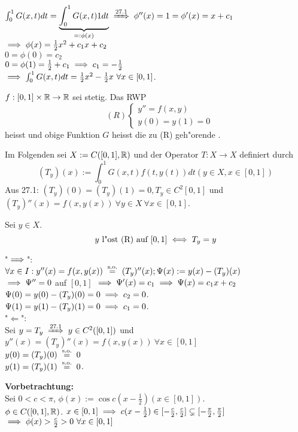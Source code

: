 \documentclass{article}
\begin{document}
\begin{beispiel}
$\int_0^1G(x,t)dt=\underbrace{\int_0^1G(x,t)1dt}_{=:\phi(x)}\folgtnach{27.1} \phi''(x)=1=\phi'(x)=x+c_1$\\
$\implies \phi(x)=\frac{1}{2}x^2+c_1x+c_2$\\
$0=\phi(0)=c_2$\\
$0=\phi(1)=\frac{1}{2}+c_1\implies c_1=-\frac{1}{2}$\\
$\implies \int_0^1G(x,t)dt=\frac{1}{2}x^2-\frac{1}{2}x\ \forall x\in[0,1]$.\\
\end{beispiel}
\begin{definition}
$f:[0,1]\times\mathbb{R}\to\mathbb{R}$ sei stetig. Das RWP
\[ \quad
(R)
\begin{cases}
y''=f(x,y)\\
y(0)=y(1)=0
\end{cases}
\]
heisst  und obige Funktion $G$ heisst die zu (R) geh"orende .
\end{definition}
Im Folgenden sei $X:=C([0,1],\mathbb{R})$ und der Operator $T:X\to X$ definiert durch\\
$$(T_y)(x):=\int_0^1G(x,t)f(t,y(t))dt (y\in X, x\in[0,1])$$
Aus 27.1: $(T_y)(0)=(T_y)(1)=0, T_y \in C^2[0,1]$ und $(T_y)''(x)=f(x,y(x))\ \forall y\in X\ \forall x\in[0,1]$.
\begin{satz}
Sei $y\in X$.
$$y \text{ l"ost (R) auf } [0,1] \iff T_y=y$$
\end{satz}
\begin{beweis}
"$\implies$":\\
$\forall x\in I: y''(x) = f(x,y(x)) \gleichnach{s.o.} (T_y)''(x);\Psi(x):=y(x)-(T_y)(x)$\\
$\implies \Psi'' = 0$ auf $[0,1]$ $\implies \Psi'(x) = c_1 \implies \Psi(x) = c_1x+c_2$\\
$\Psi(0)=y(0)-(T_y)(0)=0 \implies c_2=0$.\\
$\Psi(1)=y(1)-(T_y)(1)=0 \implies c_1=0$.\\
"$\Leftarrow$":\\
Sei $y=T_y \folgtnach{27.1} y\in C^2([0,1])$ und $y''(x)=(T_y)''(x)=f(x,y(x))\ \forall x\in[0,1]$\\
$y(0)=(T_y)(0)\gleichnach{s.o.}0$\\
$y(1)=(T_y)(1)\gleichnach{s.o.}0$.
\end{beweis}

\textbf{Vorbetrachtung:}\\
Sei $0<c<\pi$, $\phi(x):=\cos{c(x-\frac{1}{2})}(x\in[0,1])$.\\
$\phi \in C([0,1],\mathbb{R})$. $x\in[0,1]\implies c(x-\frac{1}{2}) \in [-\frac{c}{2},\frac{c}{2}]\subsetneq[-\frac{\pi}{2},\frac{\pi}{2}]$\\
$\implies \phi(x)>\frac{c}{2}>0\ \forall x \in [0,1]$\\
\end{document}

